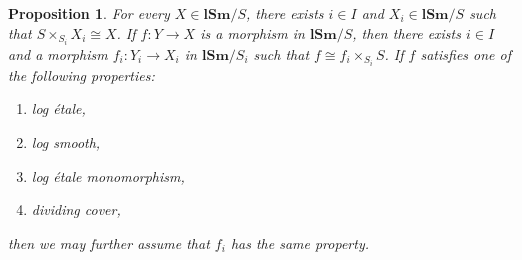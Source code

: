 \documentclass[11pt, a4paper]{amsart}
\newtheorem{prop}[thm]{Proposition}
\theoremstyle{definition}
\numberwithin{equation}{subsection}
\newcommand{\lSm}{\mathbf{lSm}}
\begin{document}
\begin{prop}
\label{noetherian.3}
For every $X\in \lSm/S$,
there exists $i\in I$ and $X_i\in \lSm/S$ such that $S\times_{S_i}X_i\cong X$.
If $f\colon Y\to X$ is a morphism in $\lSm/S$,
then there exists $i\in I$ and a morphism $f_i\colon Y_i\to X_i$ in $\lSm/S_i$ such that $f\cong f_i\times_{S_i}S$.
If $f$ satisfies one of the following properties:
\begin{enumerate}
\item[\textup{(1)}] log \'etale,
\item[\textup{(2)}] log smooth,
\item[\textup{(3)}] log \'etale monomorphism,
\item[\textup{(4)}] dividing cover,
\end{enumerate}
then we may further assume that $f_i$ has the same property.
\end{prop}
\end{document}

